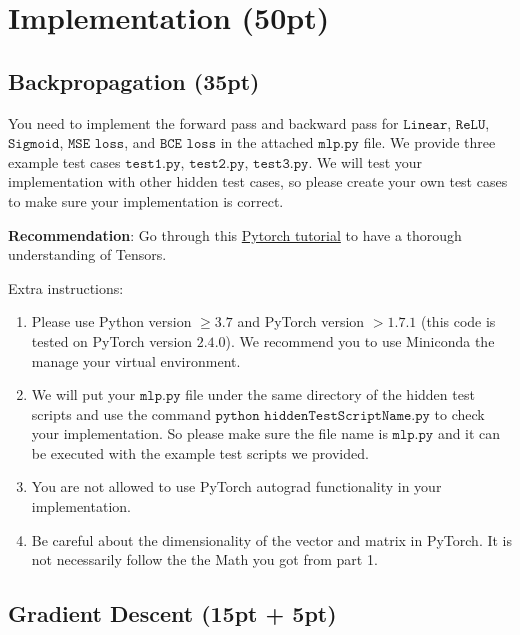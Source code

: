 \documentclass{article}
\begin{document}
\section{Implementation (50pt)}

\subsection{Backpropagation (35pt)}
You need to implement the forward pass and backward pass for $\texttt{Linear}$, $\texttt{ReLU}$, $\texttt{Sigmoid}$, $\texttt{MSE loss}$, and $\texttt{BCE loss}$ in the attached $\texttt{mlp.py}$ file.
We provide three example test cases $\texttt{test1.py}$, $\texttt{test2.py}$, $\texttt{test3.py}$.
We will test your implementation with other hidden test cases, so please create your own test cases to make sure your implementation is correct.

\textbf{Recommendation}: Go through this \href{https://pytorch.org/tutorials/beginner/basics/intro.html}{Pytorch tutorial} to have a thorough understanding of Tensors.

Extra instructions:
\begin{enumerate}
\item Please use Python version $\geq 3.7$ and PyTorch version $> 1.7.1$ (this code is tested on PyTorch version $2.4.0$). 
We recommend you to use Miniconda the manage your virtual environment.
\item We will put your $\texttt{mlp.py}$ file under the same directory of the hidden test scripts and use the command $\texttt{python hiddenTestScriptName.py}$ to check your implementation.
So please make sure the file name is $\texttt{mlp.py}$ and it can be executed with the example test scripts we provided.
\item You are not allowed to use PyTorch autograd functionality in your implementation.
\item Be careful about the dimensionality of the vector and matrix in PyTorch.
It is not necessarily follow the the Math you got from part 1.
\end{enumerate}

\subsection{Gradient Descent (15pt + 5pt)}
\end{document}
